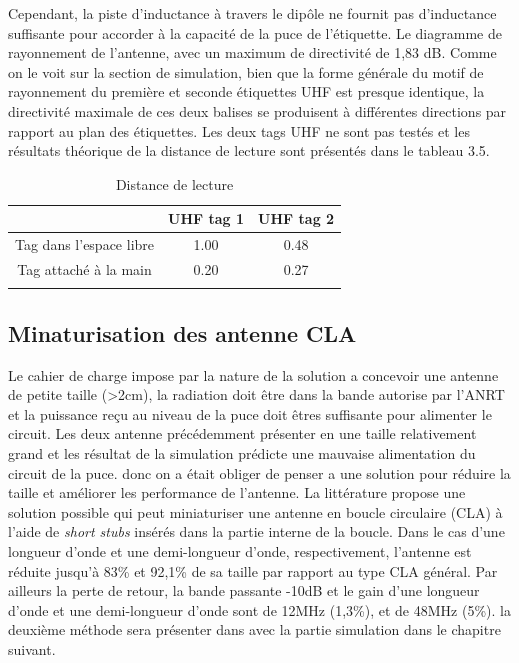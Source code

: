 \documentclass[11pt, a4paper, twoside]{book}
\begin{document}
Cependant, la piste d'inductance à travers le dipôle ne fournit pas d'inductance suffisante pour accorder à la capacité de la puce de l'étiquette. Le diagramme de rayonnement de l'antenne, avec un maximum de directivité de 1,83 dB. Comme on le voit sur la section de simulation, bien que la forme générale du motif de rayonnement du première et seconde étiquettes UHF est presque identique, la directivité maximale de ces deux balises se produisent à différentes directions par rapport au plan des étiquettes. Les deux tags UHF ne sont pas testés et les résultats théorique de la distance de lecture sont présentés dans le tableau 3.5.

\begin{longtable}[c]{| c | c | c |}
 \hline
  & UHF tag 1 & UHF tag 2 \\
 \hline
 Tag dans l'espace libre & 1.00 & 0.48\\
 \hline
 Tag attaché à la main  & 0.20 & 0.27\\
 \hline
\caption{Distance de lecture}
\end{longtable}
\subsection{Minaturisation des antenne CLA}
Le cahier de charge impose par la nature de la solution  a concevoir une antenne de petite taille (>2cm), la radiation doit être dans la bande autorise par l'ANRT et la puissance reçu au niveau de la puce doit êtres suffisante pour alimenter le circuit. Les deux antenne précédemment présenter en une taille relativement grand et les résultat de la simulation prédicte une mauvaise alimentation du circuit de la puce. donc on a était obliger de penser a une solution pour réduire la taille et améliorer les performance de l'antenne. La littérature \cite{stub}  propose une solution possible qui peut
miniaturiser une antenne en boucle circulaire (CLA) à l'aide de \emph{short stubs} insérés dans la partie interne de la boucle. Dans le cas d'une longueur d'onde et une demi-longueur d'onde, respectivement, l'antenne est réduite jusqu'à 83\% et 92,1\% de sa taille par rapport au type CLA général. Par ailleurs la perte de retour, la bande passante -10dB et le gain d'une longueur d'onde et une demi-longueur d'onde sont de 12MHz (1,3\%), et de 48MHz (5\%). la deuxième méthode sera présenter dans avec la partie simulation dans le chapitre suivant.\\
\end{document}

